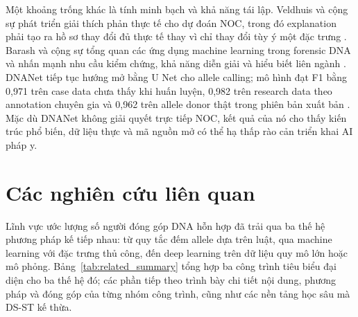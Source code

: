 \documentclass[12pt,a4paper]{article}
\begin{document}
Một khoảng trống khác là tính minh bạch và khả năng tái lập. Veldhuis và cộng sự phát triển giải thích phản thực tế cho dự đoán NOC, trong đó explanation phải tạo ra hồ sơ thay đổi đủ thực tế thay vì chỉ thay đổi tùy ý một đặc trưng \cite{veldhuis2022}. Barash và cộng sự tổng quan các ứng dụng machine learning trong forensic DNA và nhấn mạnh nhu cầu kiểm chứng, khả năng diễn giải và hiểu biết liên ngành \cite{barash2024}. DNANet tiếp tục hướng mở bằng U Net cho allele calling; mô hình đạt F1 bằng 0,971 trên case data chưa thấy khi huấn luyện, 0,982 trên research data theo annotation chuyên gia và 0,962 trên allele donor thật trong phiên bản xuất bản \cite{dewit2025}. Mặc dù DNANet không giải quyết trực tiếp NOC, kết quả của nó cho thấy kiến trúc phổ biến, dữ liệu thực và mã nguồn mở có thể hạ thấp rào cản triển khai AI pháp y.

\section{Các nghiên cứu liên quan}

Lĩnh vực ước lượng số người đóng góp DNA hỗn hợp đã trải qua ba thế hệ phương pháp kế tiếp nhau: từ quy tắc đếm allele dựa trên luật, qua machine learning với đặc trưng thủ công, đến deep learning trên dữ liệu quy mô lớn hoặc mô phỏng. Bảng~\ref{tab:related_summary} tổng hợp ba công trình tiêu biểu đại diện cho ba thế hệ đó; các phần tiếp theo trình bày chi tiết nội dung, phương pháp và đóng góp của từng nhóm công trình, cũng như các nền tảng học sâu mà DS-ST kế thừa.
\end{document}
